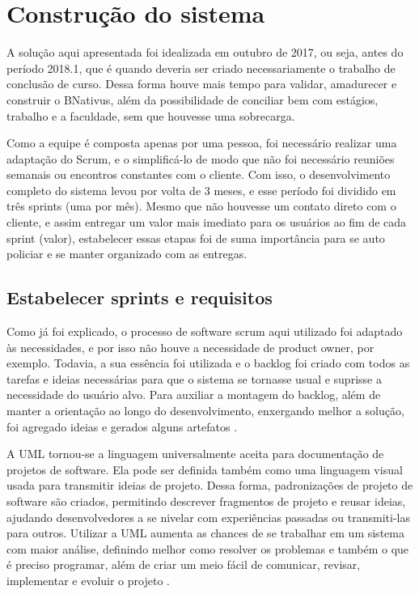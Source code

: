 \section{Construção do sistema}

A solução aqui apresentada foi idealizada em outubro de 2017, ou seja, antes do período 2018.1, que é quando deveria ser criado necessariamente o trabalho de conclusão de curso. Dessa forma houve mais tempo para validar, amadurecer e construir o BNativus, além da possibilidade de conciliar bem com estágios, trabalho e a faculdade, sem que houvesse uma sobrecarga.

Como a equipe é composta apenas por uma pessoa, foi necessário realizar uma adaptação do Scrum, e o simplificá-lo de modo que não foi necessário reuniões semanais ou encontros constantes com o cliente. Com isso, o desenvolvimento completo do sistema levou por volta de 3 meses, e esse período foi dividido em três sprints (uma por mês). Mesmo que não houvesse um contato direto com o cliente, e assim entregar um valor mais imediato para os usuários ao fim de cada sprint (valor), estabelecer essas etapas foi de suma importância para se auto policiar e se manter organizado com as entregas.

\subsection{Estabelecer sprints e requisitos}

Como já foi explicado, o processo de software scrum aqui utilizado foi adaptado às necessidades, e por isso não houve a necessidade de product owner, por exemplo. Todavia, a sua essência foi utilizada e o backlog foi criado com todos as tarefas e ideias necessárias para que o sistema se tornasse usual e suprisse a necessidade do usuário alvo. Para auxiliar a montagem do backlog, além de manter a orientação ao longo do desenvolvimento, enxergando melhor a solução, foi agregado ideias e gerados alguns artefatos . 

A UML tornou-se a linguagem universalmente aceita para documentação de projetos de software. Ela pode ser definida também como uma linguagem visual usada para transmitir ideias de projeto. Dessa forma, padronizações de projeto de software são criados, permitindo descrever fragmentos de projeto e reusar ideias, ajudando desenvolvedores a se nivelar com experiências passadas ou transmiti-las para outros. Utilizar a UML aumenta as chances de se trabalhar em um sistema com maior análise, definindo melhor como resolver os problemas e também o que é preciso programar, além de criar um meio fácil de comunicar, revisar, implementar e evoluir o projeto .

